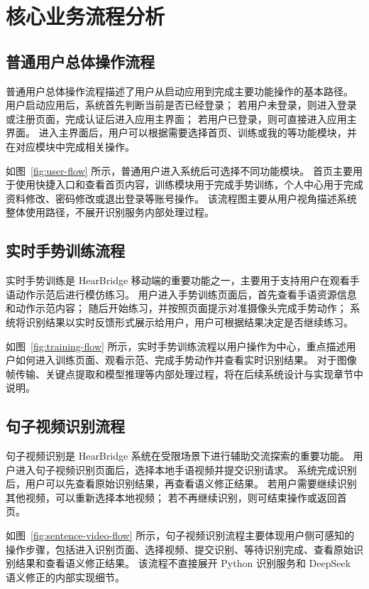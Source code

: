 
\section{核心业务流程分析}

\subsection{普通用户总体操作流程}

普通用户总体操作流程描述了用户从启动应用到完成主要功能操作的基本路径。
用户启动应用后，系统首先判断当前是否已经登录；
若用户未登录，则进入登录或注册页面，完成认证后进入应用主界面；
若用户已登录，则可直接进入应用主界面。
进入主界面后，用户可以根据需要选择首页、训练或我的等功能模块，并在对应模块中完成相关操作。


如图~\ref{fig:user-flow} 所示，普通用户进入系统后可选择不同功能模块。
首页主要用于使用快捷入口和查看首页内容，训练模块用于完成手势训练，个人中心用于完成资料修改、密码修改或退出登录等账号操作。
该流程图主要从用户视角描述系统整体使用路径，不展开识别服务内部处理过程。

\subsection{实时手势训练流程}

实时手势训练是 HearBridge 移动端的重要功能之一，主要用于支持用户在观看手语动作示范后进行模仿练习。
用户进入手势训练页面后，首先查看手语资源信息和动作示范内容；
随后开始练习，并按照页面提示对准摄像头完成手势动作；
系统将识别结果以实时反馈形式展示给用户，用户可根据结果决定是否继续练习。


如图~\ref{fig:training-flow} 所示，实时手势训练流程以用户操作为中心，重点描述用户如何进入训练页面、观看示范、完成手势动作并查看实时识别结果。
对于图像帧传输、关键点提取和模型推理等内部处理过程，将在后续系统设计与实现章节中说明。

\subsection{句子视频识别流程}

句子视频识别是 HearBridge 系统在受限场景下进行辅助交流探索的重要功能。
用户进入句子视频识别页面后，选择本地手语视频并提交识别请求。
系统完成识别后，用户可以先查看原始识别结果，再查看语义修正结果。
若用户需要继续识别其他视频，可以重新选择本地视频；
若不再继续识别，则可结束操作或返回首页。


如图~\ref{fig:sentence-video-flow} 所示，句子视频识别流程主要体现用户侧可感知的操作步骤，包括进入识别页面、选择视频、提交识别、等待识别完成、查看原始识别结果和查看语义修正结果。
该流程不直接展开 Python 识别服务和 DeepSeek 语义修正的内部实现细节。
